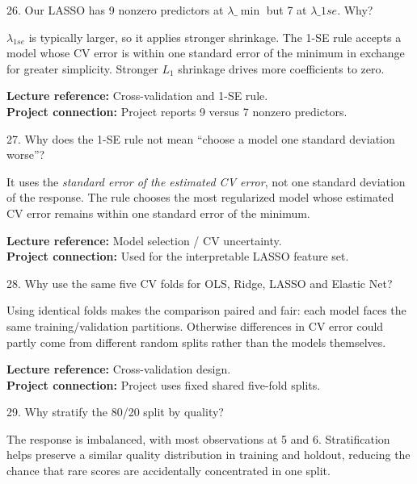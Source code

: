 \documentclass[10.5pt,a4paper]{article}
\newcommand{\chapref}[1]{\textbf{Lecture reference:} #1}
\newcommand{\projectref}[1]{\textbf{Project connection:} #1}
\begin{document}
\begin{qbox}{26. Our LASSO has 9 nonzero predictors at $\lambda\_{\min}$ but 7 at $\lambda\_{1se}$. Why?}
\end{qbox}
\begin{answerbox}\(\lambda_{1se}\) is typically larger, so it applies stronger shrinkage. The 1-SE rule accepts a model whose CV error is within one standard error of the minimum in exchange for greater simplicity. Stronger \(L_1\) shrinkage drives more coefficients to zero.\end{answerbox}
\begin{refbox}\chapref{Cross-validation and 1-SE rule.}\\\projectref{Project reports 9 versus 7 nonzero predictors.}\end{refbox}
\begin{qbox}{27. Why does the 1-SE rule not mean ``choose a model one standard deviation worse''?}
\end{qbox}
\begin{answerbox}It uses the \emph{standard error of the estimated CV error}, not one standard deviation of the response. The rule chooses the most regularized model whose estimated CV error remains within one standard error of the minimum.\end{answerbox}
\begin{refbox}\chapref{Model selection / CV uncertainty.}\\\projectref{Used for the interpretable LASSO feature set.}\end{refbox}
\begin{qbox}{28. Why use the same five CV folds for OLS, Ridge, LASSO and Elastic Net?}
\end{qbox}
\begin{answerbox}Using identical folds makes the comparison paired and fair: each model faces the same training/validation partitions. Otherwise differences in CV error could partly come from different random splits rather than the models themselves.\end{answerbox}
\begin{refbox}\chapref{Cross-validation design.}\\\projectref{Project uses fixed shared five-fold splits.}\end{refbox}
\begin{qbox}{29. Why stratify the 80/20 split by quality?}
\end{qbox}
\begin{answerbox}The response is imbalanced, with most observations at 5 and 6. Stratification helps preserve a similar quality distribution in training and holdout, reducing the chance that rare scores are accidentally concentrated in one split.\end{answerbox}
\end{document}
